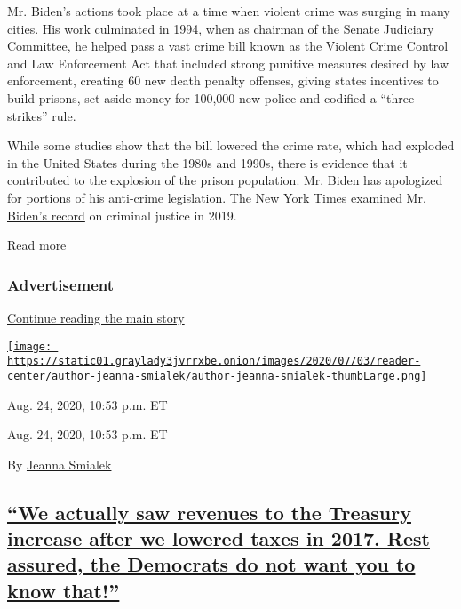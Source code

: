 Mr. Biden's actions took place at a time when violent crime was surging
in many cities. His work culminated in 1994, when as chairman of the
Senate Judiciary Committee, he helped pass a vast crime bill known as
the Violent Crime Control and Law Enforcement Act that included strong
punitive measures desired by law enforcement, creating 60 new death
penalty offenses, giving states incentives to build prisons, set aside
money for 100,000 new police and codified a ``three strikes'' rule.

While some studies show that the bill lowered the crime rate, which had
exploded in the United States during the 1980s and 1990s, there is
evidence that it contributed to the explosion of the prison population.
Mr. Biden has apologized for portions of his anti-crime legislation.
\href{https://www.nytimes3xbfgragh.onion/2019/06/25/us/joe-biden-crime-laws.html}{The
New York Times examined Mr. Biden's record} on criminal justice in 2019.

Read more

\hypertarget{advertisement}{%
\subsubsection{Advertisement}\label{advertisement}}

\protect\hyperlink{after-dfp-ad-mid1}{Continue reading the main story}

\href{https://www.nytimes3xbfgragh.onion/by/jeanna-smialek}{\texttt{[image: https://static01.graylady3jvrrxbe.onion/images/2020/07/03/reader-center/author-jeanna-smialek/author-jeanna-smialek-thumbLarge.png]}}

Aug. 24, 2020, 10:53 p.m. ET

Aug. 24, 2020, 10:53 p.m. ET

By \href{https://www.nytimes3xbfgragh.onion/by/jeanna-smialek}{Jeanna
Smialek}

\hypertarget{we-actually-saw-revenues-to-the-treasury-increase-after-we-lowered-taxes-in-2017-rest-assured-the-democrats-do-not-want-you-to-know-that}{%
\subsection{\texorpdfstring{\protect\hyperlink{we-actually-saw-revenues-to-the-treasury-increase-after-we-lowered-taxes-in-2017-rest-assured-the-democrats-do-not-want-you-to-k}{``We
actually saw revenues to the Treasury increase after we lowered taxes in
2017. Rest assured, the Democrats do not want you to know
that!''}}{``We actually saw revenues to the Treasury increase after we lowered taxes in 2017. Rest assured, the Democrats do not want you to know that!''}}\label{we-actually-saw-revenues-to-the-treasury-increase-after-we-lowered-taxes-in-2017-rest-assured-the-democrats-do-not-want-you-to-know-that}}


